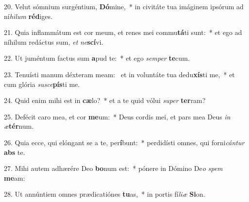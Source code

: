 20. Velut sómnium surgéntium, \textbf{Dó}mine,~*  in civitáte tua imáginem ipsórum ad ní\textit{hi}\textit{lum} \textbf{réd}iges.\

21. Quia inflammátum est cor meum, et renes mei commu\textbf{tá}ti sunt:~*  et ego ad níhilum redáctus sum, \textit{et} \textit{ne}\textbf{scí}vi.\

22. Ut juméntum factus sum \textbf{a}pud te:~*  et ego \textit{sem}\textit{per} \textbf{te}cum.\

23. Tenuísti manum déxteram meam: \dag\  et in voluntáte tua dedu\textbf{xís}ti me,~*  et cum glória \textit{su}\textit{sce}\textbf{pís}ti me.\

24. Quid enim mihi est in \textbf{cæ}lo?~*  et a te quid vólui \textit{su}\textit{per} \textbf{ter}ram?\

25. Defécit caro mea, et cor \textbf{me}um:~*  Deus cordis mei, et pars mea Deus \textit{in} \textit{æ}\textbf{tér}num.\

26. Quia ecce, qui elóngant se a te, per\textbf{í}bunt:~*  perdidísti omnes, qui forni\textit{cán}\textit{tur} \textbf{abs} te.\

27. Mihi autem adhærére Deo \textbf{bo}num est:~*  pónere in Dómino De\textit{o} \textit{spem} \textbf{me}am:\

28. Ut annúntiem omnes prædicatiónes \textbf{tu}as,~*  in portis fí\textit{li}\textit{æ} \textbf{Si}on.\

